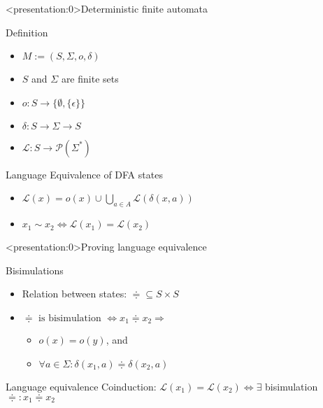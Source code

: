 \begin{frame}<presentation:0>{Deterministic finite automata}
  \begin{block}{Definition}
    \begin{itemize}
      \item $M := (S, \Sigma, o, \delta)$
      \item $S$ and $\Sigma$ are finite sets
      \item $o : S \to \{\emptyset, \{\epsilon\} \}$
      \item $\delta : S \to \Sigma \to S$
      \item $\mathcal{L} : S \to \mathcal{P}(\Sigma^\ast)$
    \end{itemize}
  \end{block}

  \begin{block}{Language Equivalence of DFA states}
    \begin{itemize}
      \item $\mathcal{L}(x) = o(x) \cup \bigcup_{a \in A}{\mathcal{L}({\delta(x, a)})}$
      \item $x_1 \sim x_2 \Leftrightarrow \mathcal{L}(x_1) = \mathcal{L}(x_2)$
    \end{itemize}
  \end{block}
\end{frame}

\begin{frame}<presentation:0>{Proving language equivalence}
  \begin{block}{Bisimulations}
    \begin{itemize}
      \item Relation between states: $\doteqdot \subseteq S \times S$
      \item $\doteqdot \text{ is bisimulation } \Leftrightarrow x_1 \doteqdot x_2 \Rightarrow $
        \begin{itemize}
          \item $o(x) = o(y)$, and
          \item $\forall a \in \Sigma: \delta(x_1, a) \doteqdot \delta(x_2, a)$
        \end{itemize}
    \end{itemize}
   \end{block}

   \begin{block}{Language equivalence}
     Coinduction:
     $\mathcal{L}(x_1) = \mathcal{L}(x_2) \Leftrightarrow \exists$ bisimulation $\doteqdot: x_1 \doteqdot x_2$
   \end{block}
\end{frame}

